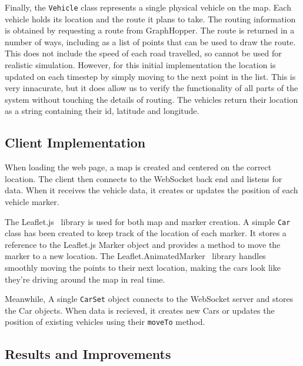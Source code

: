 \documentclass[ %
                    author={Alexander Hill},
                supervisor={Dr. Benjamin Sach},
                    degree={MEng},
                     title={MARMOSET},
                  subtitle={Multi-Agent Route Management using Online Simulation for Efficient Transportation},
                      type={research},
                      year={2016} ]{dissertation}
\begin{document}
Finally, the \texttt{Vehicle} class represents a single physical vehicle on the
map. Each vehicle holds its location and the route it plans to take. The routing
information is obtained by requesting a route from GraphHopper. The route is
returned in a number of ways, including as a list of points that can be used to
draw the route. This does not include the speed of each road travelled, so
cannot be used for realistic simulation. However, for this initial
implementation the location is updated on each timestep by simply moving to the
next point in the list. This is very innacurate, but it does allow us to verify
the functionality of all parts of the system without touching the details of
routing. The vehicles return their location as a string containing their id,
latitude and longitude.

\subsection{Client Implementation}

When loading the web page, a map is created and centered on the correct
location.  The client then connects to the WebSocket back end and listens for
data. When it receives the vehicle data, it creates or updates the position of
each vehicle marker.

The Leaflet.js~\cite{leaflet} library is used for both map and marker creation.
A simple \texttt{Car} class has been created to keep track of the location of
each marker. It stores a reference to the Leaflet.js Marker object and provides
a method to move the marker to a new location. The
Leaflet.AnimatedMarker~\cite{animarker} library handles smoothly moving the
points to their next location, making the cars look like they're driving around
the map in real time.

Meanwhile, A single \texttt{CarSet} object connects to the WebSocket server and
stores the Car objects. When data is recieved, it creates new Cars or updates
the position of existing vehicles using their \texttt{moveTo} method.

\subsection{Results and Improvements}
\end{document}
